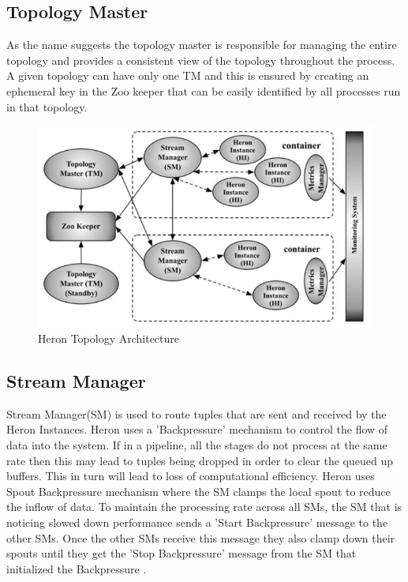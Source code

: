 \documentclass[9pt,twocolumn,twoside]{../../styles/osajnl}
\begin{document}
\subsection{Topology Master}
As the name suggests the topology master is responsible for managing the entire topology and provides a consistent view of the topology throughout the process. A given topology can have only one TM and this is ensured by creating an ephemeral key in the Zoo keeper that can be easily identified by all processes run in that topology. 
\begin{figure}[htbp]
\begin{center}
\centering
\includegraphics[width=\linewidth]{images/img2}
\caption{Heron Topology Architecture \cite{TwitterHeron2}}
\label{fig:false-color}
\end{center}
\end{figure}
\subsection{Stream Manager}
Stream Manager(SM) is used to route tuples that are sent and received by the Heron Instances. Heron uses a 'Backpressure' mechanism to control the flow of data into the system. If in a pipeline, all the stages do not process at the same rate then this may lead to tuples being dropped in order to clear the queued up buffers. This in turn will lead to loss of computational efficiency. Heron uses Spout Backpressure mechanism where the SM clamps the local spout to reduce the inflow of data. To maintain the processing rate across all SMs, the SM that is noticing slowed down performance sends a 'Start Backpressure' message to the other SMs. Once the other SMs receive this message they also clamp down their spouts until they get the 'Stop Backpressure' message from the SM that initialized the Backpressure \cite{TwitterHeron3}.
\end{document}
